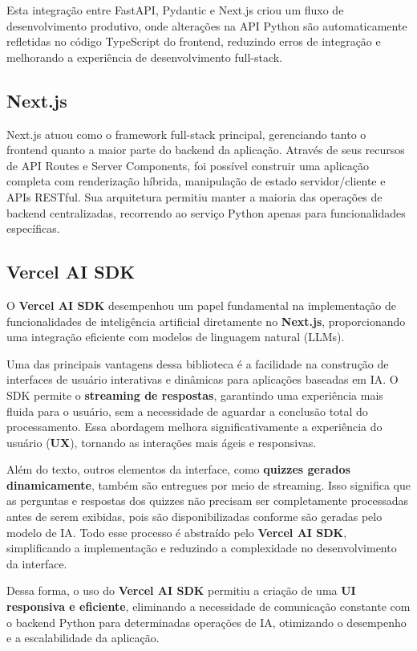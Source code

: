 \documentclass[tcc,capa]{texufpel}
\begin{document}
Esta integração entre FastAPI, Pydantic e Next.js criou um fluxo de desenvolvimento produtivo, onde alterações na API Python são automaticamente refletidas no código TypeScript do frontend, reduzindo erros de integração e melhorando a experiência de desenvolvimento full-stack.

\subsection{Next.js}
Next.js atuou como o framework full-stack principal, gerenciando tanto o frontend quanto a maior parte do backend da aplicação. Através de seus recursos de API Routes e Server Components, foi possível construir uma aplicação completa com renderização híbrida, manipulação de estado servidor/cliente e APIs RESTful. Sua arquitetura permitiu manter a maioria das operações de backend centralizadas, recorrendo ao serviço Python apenas para funcionalidades específicas.

\subsection{Vercel AI SDK}

O \textbf{Vercel AI SDK} desempenhou um papel fundamental na implementação de funcionalidades de inteligência artificial diretamente no \textbf{Next.js}, proporcionando uma integração eficiente com modelos de linguagem natural (LLMs).  

Uma das principais vantagens dessa biblioteca é a facilidade na construção de interfaces de usuário interativas e dinâmicas para aplicações baseadas em IA. O SDK permite o \textbf{streaming de respostas}, garantindo uma experiência mais fluida para o usuário, sem a necessidade de aguardar a conclusão total do processamento. Essa abordagem melhora significativamente a experiência do usuário (\textbf{UX}), tornando as interações mais ágeis e responsivas.  

Além do texto, outros elementos da interface, como \textbf{quizzes gerados dinamicamente}, também são entregues por meio de streaming. Isso significa que as perguntas e respostas dos quizzes não precisam ser completamente processadas antes de serem exibidas, pois são disponibilizadas conforme são geradas pelo modelo de IA. Todo esse processo é abstraído pelo \textbf{Vercel AI SDK}, simplificando a implementação e reduzindo a complexidade no desenvolvimento da interface.  

Dessa forma, o uso do \textbf{Vercel AI SDK} permitiu a criação de uma \textbf{UI responsiva e eficiente}, eliminando a necessidade de comunicação constante com o backend Python para determinadas operações de IA, otimizando o desempenho e a escalabilidade da aplicação.
\end{document}
